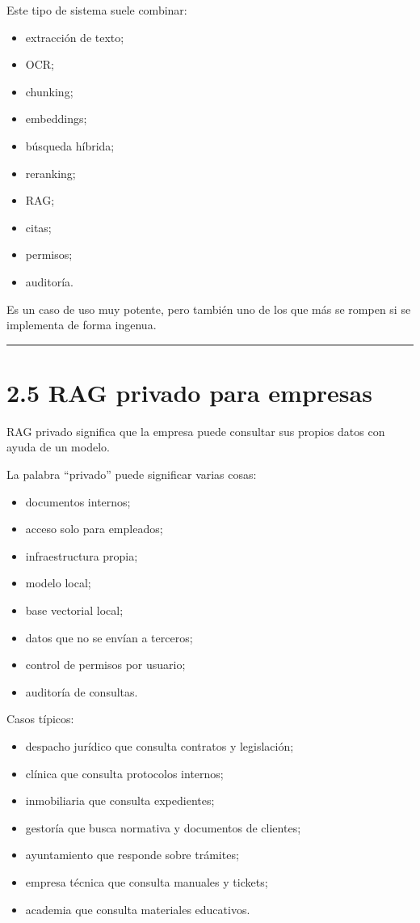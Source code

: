 Este tipo de sistema suele combinar:

\begin{itemize}
\tightlist
\item
  extracción de texto;
\item
  OCR;
\item
  chunking;
\item
  embeddings;
\item
  búsqueda híbrida;
\item
  reranking;
\item
  RAG;
\item
  citas;
\item
  permisos;
\item
  auditoría.
\end{itemize}

Es un caso de uso muy potente, pero también uno de los que más se rompen
si se implementa de forma ingenua.

\begin{center}\rule{0.5\linewidth}{0.5pt}\end{center}

\section{2.5 RAG privado para empresas}\label{rag-privado-para-empresas}

RAG privado significa que la empresa puede consultar sus propios datos
con ayuda de un modelo.

La palabra ``privado'' puede significar varias cosas:

\begin{itemize}
\tightlist
\item
  documentos internos;
\item
  acceso solo para empleados;
\item
  infraestructura propia;
\item
  modelo local;
\item
  base vectorial local;
\item
  datos que no se envían a terceros;
\item
  control de permisos por usuario;
\item
  auditoría de consultas.
\end{itemize}

Casos típicos:

\begin{itemize}
\tightlist
\item
  despacho jurídico que consulta contratos y legislación;
\item
  clínica que consulta protocolos internos;
\item
  inmobiliaria que consulta expedientes;
\item
  gestoría que busca normativa y documentos de clientes;
\item
  ayuntamiento que responde sobre trámites;
\item
  empresa técnica que consulta manuales y tickets;
\item
  academia que consulta materiales educativos.
\end{itemize}

